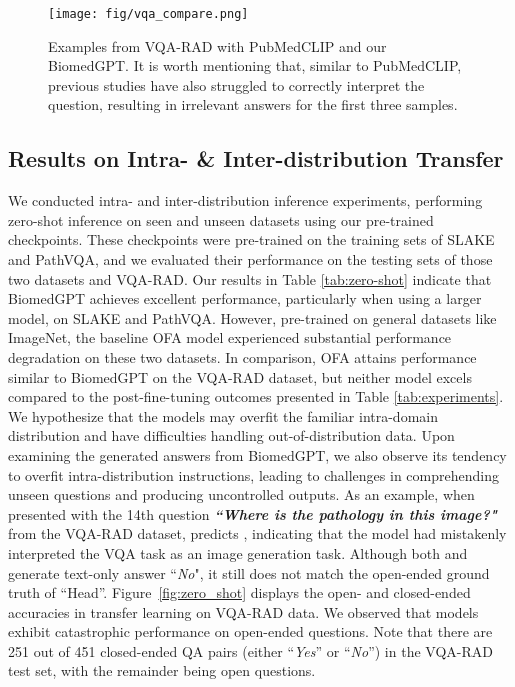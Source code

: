 \documentclass[10pt]{article} \usepackage[preprint]{tmlr}
\begin{document}
\begin{figure*}[]
    \centering
    \texttt{[image: fig/vqa\_compare.png]}
    \caption{Examples from VQA-RAD with PubMedCLIP and our BiomedGPT. It is worth mentioning that, similar to PubMedCLIP, previous studies \citep{nguyen2019overcoming, zhan2020medical} have also struggled to correctly interpret the question, resulting in irrelevant answers for the first three samples.}
    \label{fig:vqa_compare}
\end{figure*}

\subsection{Results on Intra- \& Inter-distribution Transfer}

We conducted intra- and inter-distribution inference experiments, performing zero-shot inference on seen and unseen datasets using our pre-trained checkpoints. These checkpoints were pre-trained on the training sets of SLAKE and PathVQA, and we evaluated their performance on the testing sets of those two datasets and VQA-RAD. Our results in Table \ref{tab:zero-shot} indicate that BiomedGPT achieves excellent performance, particularly when using a larger model, on SLAKE and PathVQA. However, pre-trained on general datasets like ImageNet, the baseline OFA model experienced substantial performance degradation on these two datasets. In comparison, OFA attains performance similar to BiomedGPT on the VQA-RAD dataset, but neither model excels compared to the post-fine-tuning outcomes presented in Table \ref{tab:experiments}. We hypothesize that the models may overfit the familiar intra-domain distribution and have difficulties handling out-of-distribution data. Upon examining the generated answers from BiomedGPT, we also observe its tendency to overfit intra-distribution instructions, leading to challenges in comprehending unseen questions and producing uncontrolled outputs. As an example, when presented with the 14th question \textbf{\textit{``Where is the pathology in this image?"}} from the VQA-RAD dataset,  predicts , indicating that the model had mistakenly interpreted the VQA task as an image generation task. Although both  and  generate text-only answer ``\textit{No}", it still does not match the open-ended ground truth of ``Head''. Figure~\ref{fig:zero_shot} displays the open- and closed-ended accuracies in transfer learning on VQA-RAD data. We observed that models exhibit catastrophic performance on open-ended questions. Note that there are 251 out of 451 closed-ended QA pairs (either ``\textit{Yes}'' or ``\textit{No}'') in the VQA-RAD test set, with the remainder being open questions.
\end{document}
